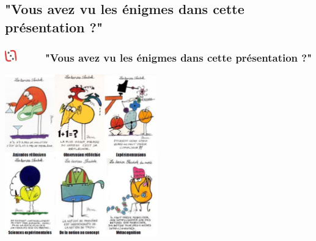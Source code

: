 \documentclass[slidetop,11pt]{beamer}
\def\moreInFrameTitleLeftt{\includegraphics[height=0.5cm]{img/ligueludique-0.png}~~~~~}
\begin{document}
\def\sectionPartIIIc{"Vous avez vu les {\'e}nigmes dans cette pr{\'e}sentation ?"}
\subsection{\sectionPartIIIc}
\begin{frame}
	\frametitle{\moreInFrameTitleLeftt \sectionPartIIIc}
	\begin{center}
		\includegraphics[height=7.0cm]{img/shadoks_devises.png} %
	\end{center}
\end{frame}


\def\sectionPartIIIe{"D{\'e}bats et controverses" / "Cicada 3301", un ARG ?}
\end{document}
